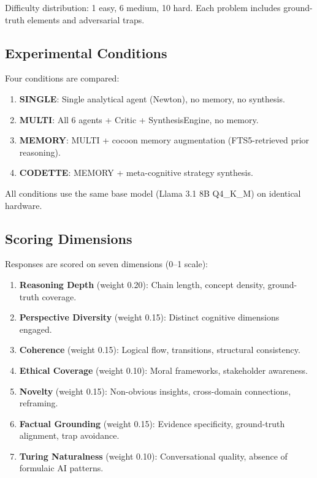 \documentclass[11pt,a4paper]{article}
\begin{document}
Difficulty distribution: 1 easy, 6 medium, 10 hard. Each problem includes ground-truth elements and adversarial traps.

\subsection{Experimental Conditions}

Four conditions are compared:

\begin{enumerate}[nosep]
  \item \textbf{SINGLE}: Single analytical agent (Newton), no memory, no synthesis.
  \item \textbf{MULTI}: All 6 agents + Critic + SynthesisEngine, no memory.
  \item \textbf{MEMORY}: MULTI + cocoon memory augmentation (FTS5-retrieved prior reasoning).
  \item \textbf{CODETTE}: MEMORY + meta-cognitive strategy synthesis.
\end{enumerate}

All conditions use the same base model (Llama 3.1 8B Q4\_K\_M) on identical hardware.

\subsection{Scoring Dimensions}

Responses are scored on seven dimensions (0--1 scale):

\begin{enumerate}[nosep]
  \item \textbf{Reasoning Depth} (weight 0.20): Chain length, concept density, ground-truth coverage.
  \item \textbf{Perspective Diversity} (weight 0.15): Distinct cognitive dimensions engaged.
  \item \textbf{Coherence} (weight 0.15): Logical flow, transitions, structural consistency.
  \item \textbf{Ethical Coverage} (weight 0.10): Moral frameworks, stakeholder awareness.
  \item \textbf{Novelty} (weight 0.15): Non-obvious insights, cross-domain connections, reframing.
  \item \textbf{Factual Grounding} (weight 0.15): Evidence specificity, ground-truth alignment, trap avoidance.
  \item \textbf{Turing Naturalness} (weight 0.10): Conversational quality, absence of formulaic AI patterns.
\end{enumerate}
\end{document}
